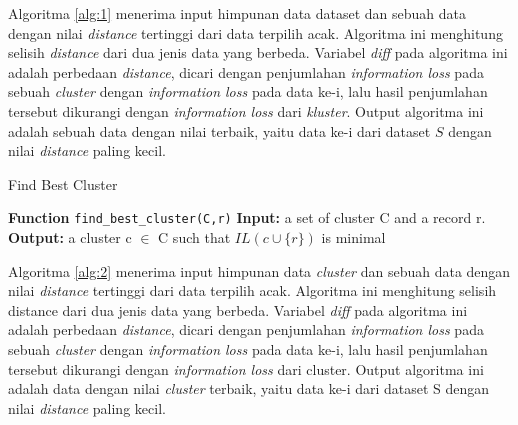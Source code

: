 \documentclass[a4paper,twoside]{article}
\begin{document}
\begin{enumerate}
Algoritma \ref{alg:1} menerima input himpunan data dataset dan sebuah data dengan nilai \textit{distance} tertinggi dari data terpilih acak. Algoritma ini menghitung selisih \textit{distance} dari dua jenis data yang berbeda. Variabel \textit{diff} pada algoritma ini adalah perbedaan \textit{distance}, dicari dengan penjumlahan \textit{information loss} pada sebuah \textit{cluster} dengan \textit{information loss} pada data ke-i, lalu hasil penjumlahan tersebut dikurangi dengan \textit{information loss} dari \textit{kluster}. Output algoritma ini adalah sebuah data dengan nilai terbaik, yaitu data ke-i dari dataset $S$ dengan nilai \textit{distance} paling kecil.

\begin{tcolorbox}[blanker,width=(\linewidth-0.5cm)]
\begin{algorithm}[H]
  \caption{Find Best Cluster}\label{alg:2}
  \begin{algorithmic}[1]
  \State \textbf{Function} \texttt{find\_best\_cluster(C,r)}
  \State \textbf{Input:} a set of cluster C and a record r.
  \State \textbf{Output:} a cluster c $\in$ C such that $IL(c \cup \{r\})$ is minimal
  \\
  \EndIf
  \EndFor
  \end{algorithmic}
\end{algorithm}
\end{tcolorbox}

Algoritma \ref{alg:2} menerima input himpunan data \textit{cluster} dan sebuah data dengan nilai \textit{distance} tertinggi dari data terpilih acak. Algoritma ini menghitung selisih distance dari dua jenis data yang berbeda. Variabel \textit{diff} pada algoritma ini adalah perbedaan \textit{distance}, dicari dengan penjumlahan \textit{information loss} pada sebuah \textit{cluster} dengan \textit{information loss} pada data ke-i, lalu hasil penjumlahan tersebut dikurangi dengan \textit{information loss} dari {cluster}. Output algoritma ini adalah data dengan nilai \textit{cluster} terbaik, yaitu data ke-i dari dataset S dengan nilai \textit{distance} paling kecil.


\end{enumerate}
\end{document}
